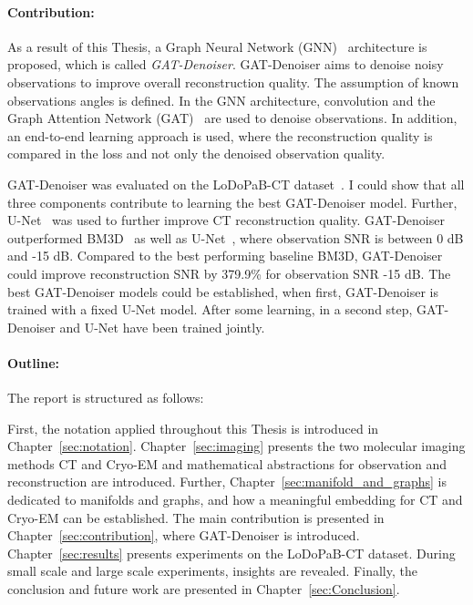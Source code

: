 \paragraph{Contribution:}

As a result of this Thesis, a Graph Neural Network (GNN)~\cite{GNN} architecture is proposed, which is called \textit{GAT-Denoiser}.
GAT-Denoiser aims to denoise noisy observations to improve overall reconstruction quality.
The assumption of known observations angles is defined.
In the GNN architecture, convolution and the Graph Attention Network (GAT)~\cite{GAT} are used to denoise observations.
In addition, an end-to-end learning approach is used, where the reconstruction quality is compared in the loss
and not only the denoised observation quality.

GAT-Denoiser was evaluated on the LoDoPaB-CT dataset~\cite{lodopab-dataset}.
I could show that all three components contribute to learning the best GAT-Denoiser model.
Further, U-Net~\cite{unet-tomography} was used to further improve CT reconstruction quality.
GAT-Denoiser outperformed BM3D~\cite{bm3d} as well as U-Net~\cite{unet-tomography},
where observation SNR is between 0 dB and -15 dB.
Compared to the best performing baseline BM3D, GAT-Denoiser could improve reconstruction SNR 
by 379.9\% for observation SNR -15 dB.
The best GAT-Denoiser models could be established, when first, GAT-Denoiser is trained with a fixed U-Net model.
After some learning, in a second step, GAT-Denoiser and U-Net have been trained jointly.


\paragraph{Outline:}

The report is structured as follows: 

First, the notation applied throughout this Thesis is introduced in Chapter~\ref{sec:notation}.
 Chapter~\ref{sec:imaging} presents the two molecular imaging methods
CT and Cryo-EM and mathematical abstractions for observation and reconstruction are introduced.
Further, Chapter~\ref{sec:manifold_and_graphs} is dedicated to manifolds and graphs,
and how a meaningful embedding for CT and Cryo-EM can be established. 
The main contribution is presented in Chapter~\ref{sec:contribution}, 
where GAT-Denoiser is introduced. Chapter~\ref{sec:results} presents experiments on the LoDoPaB-CT dataset.
During small scale and large scale experiments, insights are revealed.
Finally, the conclusion and future work are presented in Chapter~\ref{sec:Conclusion}.

